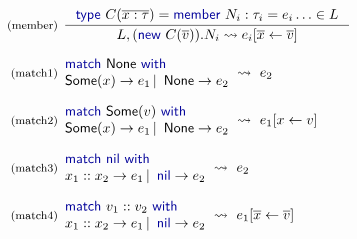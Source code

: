 \documentclass[10pt,preprint,clearpagebib]{sigplanconf}
\newcommand{\kvd}[1]{\textnormal{\textcolor{kvdclr}{\sffamily #1}}}
\newcommand{\ident}[1]{\textnormal{\sffamily #1}}
\newcommand{\reduce}{\rightsquigarrow}
\begin{document}

\begin{figure}
\noindent
\begin{equation*}
\begin{array}{rl}
 \textnormal{\footnotesize{(member)}}&
 \hspace{-0.6em}
 \inference
 { \kvd{type}~C(\overline{x:\tau})= \kvd{member}~N_i : \tau_i = e_i \ldots \in L }
 { L, (\kvd{new}~C(\overline{v})).N_i \reduce e_i[\overline{x} \leftarrow \overline{v}] }\\
 \\[-0.2em]
 \textnormal{\footnotesize{(match1)}}&
 \hspace{-1em}
 \begin{array}{l}
  \kvd{match}~\ident{None}~\kvd{with} \\
  \ident{Some}(x) \rightarrow e_1 \,|\, \ident{None} \rightarrow e_2
 \end{array} \hspace{-0.5em} ~\reduce~ e_2 \\
 \\[-0.2em]
 \textnormal{\footnotesize{(match2)}}&
 \hspace{-1em}
 \begin{array}{l}
    \kvd{match}~\ident{Some}(v)~\kvd{with} \\
    \ident{Some}(x) \rightarrow e_1 \,|\, \ident{None} \rightarrow e_2
 \end{array} \hspace{-0.5em} ~\reduce~ e_1[x\leftarrow v]\\
 \\[-0.2em]
 \textnormal{\footnotesize{(match3)}}&
 \hspace{-1em}
 \begin{array}{l}
  \kvd{match}~\kvd{nil}~\kvd{with} \\[0em]
  x_1::x_2 \rightarrow e_1 \,|\, \kvd{nil} \rightarrow e_2
 \end{array} \hspace{-0.5em} ~\reduce~ e_2\\
 \\[-0.2em]
 \textnormal{\footnotesize{(match4)}}&
 \hspace{-1em}
 \begin{array}{l}
  \kvd{match}~v_1::v_2~\kvd{with} \\[0em]
  x_1::x_2 \rightarrow e_1 \,|\, \kvd{nil} \rightarrow e_2
 \end{array} \hspace{-0.5em} ~\reduce~ e_1[\overline{x}\leftarrow\overline{v}] \\

\end{array}
\end{equation*}
\end{figure}
\end{document}
